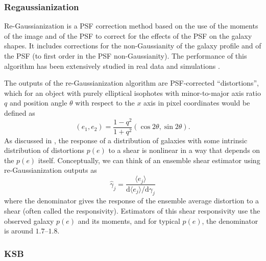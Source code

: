 \documentclass[iop]{emulateapj}
\begin{document}
\subsubsection{Regaussianization}

 Re-Gaussianization \citep{2003MNRAS.343..459H} is a PSF correction method based on the use of the
 moments of the image and of the PSF to correct for the effects of the PSF on the galaxy shapes. It
 includes corrections for the non-Gaussianity of the galaxy profile
 \citep{2002AJ....123..583B,2003MNRAS.343..459H} and of the PSF (to first order in the PSF
 non-Gaussianity). The performance of this algorithm has been extensively studied in real data and
 simulations
 \citep[e.g.,][]{2005MNRAS.361.1287M,2012MNRAS.420.1518M,2013MNRAS.432.1544M,2015MNRAS.450.2963M}.

The outputs of the re-Gaussianization algorithm are PSF-corrected ``distortions'', which for an
object with purely elliptical isophotes with minor-to-major axis ratio $q$ and position angle
$\theta$ with respect to the $x$ axis in pixel coordinates would be defined as
\begin{equation}
(e_1, e_2) = \frac{1-q^2}{1+q^2}\left(\cos{2\theta},\sin{2\theta}\right).
\end{equation}
As discussed in \cite{2002AJ....123..583B}, the response of a distribution of galaxies with some intrinsic
distribution of distortions $p(e)$ to a shear is nonlinear in a way that depends on the $p(e)$
itself.  Conceptually, we can think of an ensemble shear estimator using re-Gaussianization outputs
as
\begin{equation}
\hat{\gamma}_j = \frac{\langle e_j\rangle}{\mathrm{d}\langle e_j\rangle/\mathrm{d}\gamma_j}
\end{equation}
where the denominator gives the response of the ensemble average distortion to a shear (often called
the responsivity).  Estimators of this shear responsivity use the observed galaxy $p(e)$ and its
moments, and for typical $p(e)$, the denominator is around $1.7$--$1.8$.

\subsubsection{KSB}
\end{document}
